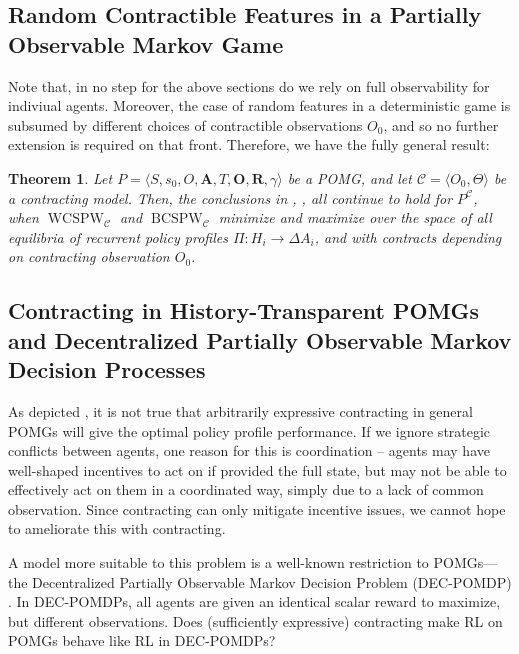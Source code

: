 \documentclass[referee,sn-basic]{sn-jnl}
\theoremstyle{thmstyleone}%
\newtheorem{theorem}{Theorem}%
\theoremstyle{thmstyletwo}%
\theoremstyle{thmstylethree}%
\begin{document}
\subsection{Random Contractible Features in a Partially Observable Markov Game}

Note that, in no step for the above sections do we rely on full observability for indiviual agents. Moreover, the case of random features in a deterministic game is subsumed by different choices of contractible observations $O_0$, and so no further extension is required on that front. Therefore, we have the fully general result:

\begin{theorem}\label{thm:generalpomg}
     Let $P = \langle S, s_0, O,  \mathbf  A, T, \mathbf{O}, \mathbf R, \gamma\rangle$ be a POMG, and let $\mathcal{C} = \langle O_0, \Theta \rangle$ be a contracting model. Then, the conclusions in , ,  all continue to hold for $P^\mathcal{C}$, when $\operatorname{WCSPW}_\mathcal{C}$ and $\operatorname{BCSPW}_\mathcal{C}$ minimize and maximize over the space of all equilibria of \textit{recurrent} policy profiles $\Pi: H_i \to \Delta A_i$, and with contracts depending on contracting observation $O_0$. 
\end{theorem}

\subsection{Contracting in History-Transparent POMGs and Decentralized Partially Observable Markov Decision Processes}

As depicted , it is not true that arbitrarily expressive contracting in general POMGs will give the optimal policy profile performance. If we ignore strategic conflicts between agents, one reason for this is coordination -- agents may have well-shaped incentives to act on if provided the full state, but may not be able to effectively act on them in a coordinated way, simply due to a lack of common observation. Since contracting can only mitigate incentive issues, we cannot hope to ameliorate this with contracting.

A model more suitable to this problem is a well-known restriction to POMGs---the Decentralized Partially Observable Markov Decision Problem (DEC-POMDP) \citet{bernstein2002complexity}. In DEC-POMDPs, all agents are given an identical scalar reward to maximize, but different observations. Does (sufficiently expressive) contracting make RL on POMGs behave like RL in DEC-POMDPs? 
\end{document}
